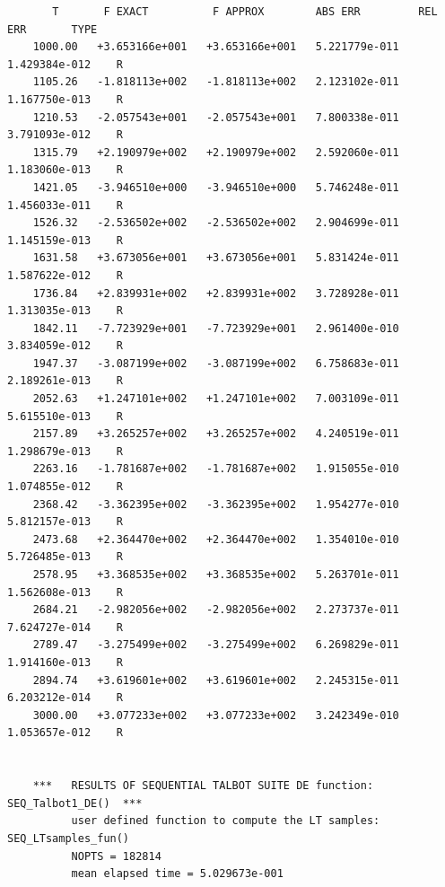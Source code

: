 \documentclass[a4paper,10pt]{report}%
\begin{document}
\begin{lstlisting}
       T       F EXACT          F APPROX        ABS ERR         REL ERR       TYPE
    1000.00   +3.653166e+001   +3.653166e+001   5.221779e-011   1.429384e-012    R
    1105.26   -1.818113e+002   -1.818113e+002   2.123102e-011   1.167750e-013    R
    1210.53   -2.057543e+001   -2.057543e+001   7.800338e-011   3.791093e-012    R
    1315.79   +2.190979e+002   +2.190979e+002   2.592060e-011   1.183060e-013    R
    1421.05   -3.946510e+000   -3.946510e+000   5.746248e-011   1.456033e-011    R
    1526.32   -2.536502e+002   -2.536502e+002   2.904699e-011   1.145159e-013    R
    1631.58   +3.673056e+001   +3.673056e+001   5.831424e-011   1.587622e-012    R
    1736.84   +2.839931e+002   +2.839931e+002   3.728928e-011   1.313035e-013    R
    1842.11   -7.723929e+001   -7.723929e+001   2.961400e-010   3.834059e-012    R
    1947.37   -3.087199e+002   -3.087199e+002   6.758683e-011   2.189261e-013    R
    2052.63   +1.247101e+002   +1.247101e+002   7.003109e-011   5.615510e-013    R
    2157.89   +3.265257e+002   +3.265257e+002   4.240519e-011   1.298679e-013    R
    2263.16   -1.781687e+002   -1.781687e+002   1.915055e-010   1.074855e-012    R
    2368.42   -3.362395e+002   -3.362395e+002   1.954277e-010   5.812157e-013    R
    2473.68   +2.364470e+002   +2.364470e+002   1.354010e-010   5.726485e-013    R
    2578.95   +3.368535e+002   +3.368535e+002   5.263701e-011   1.562608e-013    R
    2684.21   -2.982056e+002   -2.982056e+002   2.273737e-011   7.624727e-014    R
    2789.47   -3.275499e+002   -3.275499e+002   6.269829e-011   1.914160e-013    R
    2894.74   +3.619601e+002   +3.619601e+002   2.245315e-011   6.203212e-014    R
    3000.00   +3.077233e+002   +3.077233e+002   3.242349e-010   1.053657e-012    R


    ***   RESULTS OF SEQUENTIAL TALBOT SUITE DE function:  SEQ_Talbot1_DE()  ***
          user defined function to compute the LT samples:  SEQ_LTsamples_fun()
          NOPTS = 182814
          mean elapsed time = 5.029673e-001


\end{lstlisting}
\end{document}
